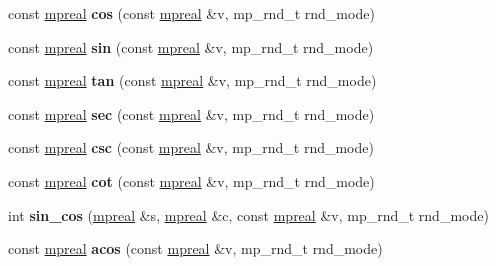 \begin{DoxyCompactItemize}
const \hyperlink{classmpfr_1_1mpreal}{mpreal} {\bfseries cos} (const \hyperlink{classmpfr_1_1mpreal}{mpreal} \&v, mp\+\_\+rnd\+\_\+t rnd\+\_\+mode)
\item 
\mbox{\label{classmpfr_1_1mpreal_a28e670f69e3590e44d9ec711e69d2c2b}} 
const \hyperlink{classmpfr_1_1mpreal}{mpreal} {\bfseries sin} (const \hyperlink{classmpfr_1_1mpreal}{mpreal} \&v, mp\+\_\+rnd\+\_\+t rnd\+\_\+mode)
\item 
\mbox{\label{classmpfr_1_1mpreal_a55ccafa8b7e4c903275b78d0c4f5daa8}} 
const \hyperlink{classmpfr_1_1mpreal}{mpreal} {\bfseries tan} (const \hyperlink{classmpfr_1_1mpreal}{mpreal} \&v, mp\+\_\+rnd\+\_\+t rnd\+\_\+mode)
\item 
\mbox{\label{classmpfr_1_1mpreal_ace518d5b5742da12bb1fc74e0ce1fdc7}} 
const \hyperlink{classmpfr_1_1mpreal}{mpreal} {\bfseries sec} (const \hyperlink{classmpfr_1_1mpreal}{mpreal} \&v, mp\+\_\+rnd\+\_\+t rnd\+\_\+mode)
\item 
\mbox{\label{classmpfr_1_1mpreal_a523d84520e860ca2bf75936f883e4967}} 
const \hyperlink{classmpfr_1_1mpreal}{mpreal} {\bfseries csc} (const \hyperlink{classmpfr_1_1mpreal}{mpreal} \&v, mp\+\_\+rnd\+\_\+t rnd\+\_\+mode)
\item 
\mbox{\label{classmpfr_1_1mpreal_a88fc2bfbe4b7dfefb1dbf3f5673ea5fa}} 
const \hyperlink{classmpfr_1_1mpreal}{mpreal} {\bfseries cot} (const \hyperlink{classmpfr_1_1mpreal}{mpreal} \&v, mp\+\_\+rnd\+\_\+t rnd\+\_\+mode)
\item 
\mbox{\label{classmpfr_1_1mpreal_a1de4bf2b882f278e3ccabec09a1c020d}} 
int {\bfseries sin\+\_\+cos} (\hyperlink{classmpfr_1_1mpreal}{mpreal} \&s, \hyperlink{classmpfr_1_1mpreal}{mpreal} \&c, const \hyperlink{classmpfr_1_1mpreal}{mpreal} \&v, mp\+\_\+rnd\+\_\+t rnd\+\_\+mode)
\item 
\mbox{\label{classmpfr_1_1mpreal_a4f1a987983f60124aa3bd09772da97e8}} 
const \hyperlink{classmpfr_1_1mpreal}{mpreal} {\bfseries acos} (const \hyperlink{classmpfr_1_1mpreal}{mpreal} \&v, mp\+\_\+rnd\+\_\+t rnd\+\_\+mode)
\item 
\mbox{\label{classmpfr_1_1mpreal_a7798a5475dc4fd0c4dec9e2ee47eb1b8}} 

\end{DoxyCompactItemize}
